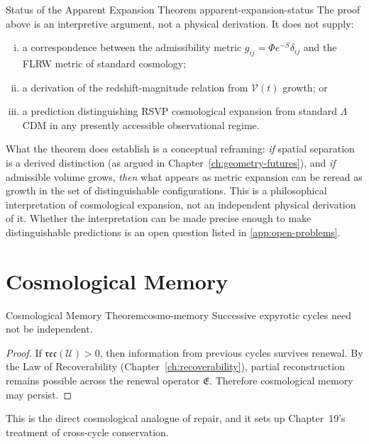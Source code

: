 \documentclass[12pt,twoside,openright]{book}
\newcommand{\reco}{\mathfrak{rec}}
\begin{document}
\begin{remark}{Status of the Apparent Expansion Theorem}%
  {apparent-expansion-status}
  The proof above is an interpretive argument, not a
  physical derivation. It does not supply:
  \begin{enumerate}[(i)]
    \item a correspondence between the admissibility
          metric $g_{ij} = \Phi e^{-S}\delta_{ij}$ and
          the FLRW metric of standard cosmology;
    \item a derivation of the redshift-magnitude relation
          from $\mathcal{V}(t)$ growth; or
    \item a prediction distinguishing RSVP cosmological
          expansion from standard $\Lambda$CDM in any
          presently accessible observational regime.
  \end{enumerate}
  What the theorem does establish is a conceptual
  reframing: \emph{if} spatial separation is a derived
  distinction (as argued in Chapter~\ref{ch:geometry-futures}),
  and \emph{if} admissible volume grows, \emph{then} what
  appears as metric expansion can be reread as growth in
  the set of distinguishable configurations. This is a
  philosophical interpretation of cosmological expansion,
  not an independent physical derivation of it. Whether
  the interpretation can be made precise enough to make
  distinguishable predictions is an open question listed
  in \cref{app:open-problems}.
\end{remark}

\section{Cosmological Memory}
\label{sec:ch18-memory}

\begin{theorem}{Cosmological Memory Theorem}{cosmo-memory}
  Successive expyrotic cycles need not be independent.
\end{theorem}

\begin{proof}
  If $\reco(\mathcal{U}) > 0$, then information from
  previous cycles survives renewal. By the Law of
  Recoverability (Chapter~\ref{ch:recoverability}), partial
  reconstruction remains possible across the renewal
  operator $\mathfrak{E}$. Therefore cosmological memory may
  persist.
\end{proof}

This is the direct cosmological analogue of repair, and it
sets up Chapter~19's treatment of cross-cycle conservation.
\end{document}
